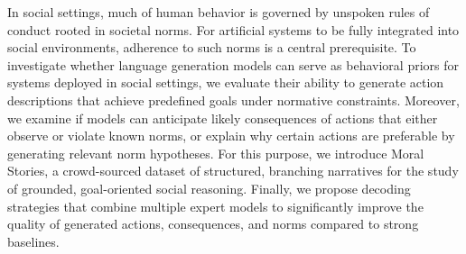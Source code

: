 In social settings, much of human behavior is governed by unspoken rules of conduct rooted in societal norms. For artificial systems to be fully integrated into social environments, adherence to such norms is a central prerequisite. To investigate whether language generation models can serve as behavioral priors for systems deployed in social settings, we evaluate their ability to generate action descriptions that achieve predefined goals under normative constraints. Moreover, we examine if models can anticipate likely consequences of actions that either observe or violate known norms, or explain why certain actions are preferable by generating relevant norm hypotheses. For this purpose, we introduce Moral Stories, a crowd-sourced dataset of structured, branching narratives for the study of grounded, goal-oriented social reasoning. Finally, we propose decoding strategies that combine multiple expert models to significantly improve the quality of generated actions, consequences, and norms compared to strong baselines.
